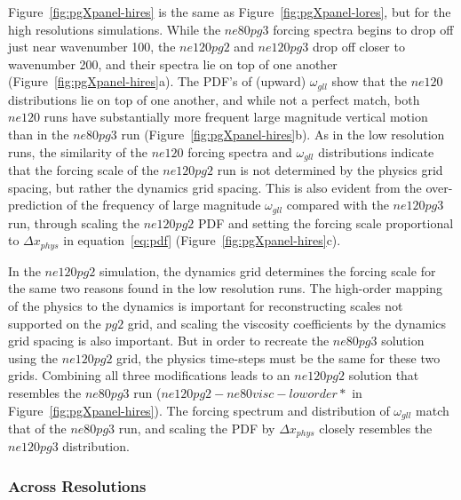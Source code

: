 \documentclass{agujournal}
\begin{document}
Figure~\ref{fig:pgXpanel-hires} is the same as Figure~\ref{fig:pgXpanel-lores}, but for the high resolutions simulations. While the $ne80pg3$ forcing spectra begins to drop off just near wavenumber 100, the $ne120pg2$ and $ne120pg3$ drop off closer to wavenumber 200, and their spectra lie on top of one another (Figure~\ref{fig:pgXpanel-hires}a). The PDF's of (upward) $\omega_{gll}$ show that the $ne120$ distributions lie on top of one another, and while not a perfect match, both $ne120$ runs have substantially more frequent large magnitude vertical motion than in the $ne80pg3$ run (Figure~\ref{fig:pgXpanel-hires}b). As in the low resolution runs, the similarity of the $ne120$ forcing spectra and $\omega_{gll}$ distributions indicate that the forcing scale of the $ne120pg2$ run is not determined by the physics grid spacing, but rather the dynamics grid spacing. This is also evident from the over-prediction of the frequency of large magnitude $\omega_{gll}$ compared with the $ne120pg3$ run, through scaling the $ne120pg2$ PDF and setting the forcing scale proportional to $\Delta x_{phys}$ in equation~\ref{eq:pdf} (Figure~\ref{fig:pgXpanel-hires}c).

In the $ne120pg2$ simulation, the dynamics grid determines the forcing scale for the same two reasons found in the low resolution runs. The high-order mapping of the physics to the dynamics is important for reconstructing scales not supported on the $pg2$ grid, and scaling the viscosity coefficients by the dynamics grid spacing is also important. But in order to recreate the $ne80pg3$ solution using the $ne120pg2$ grid, the physics time-steps must be the same for these two grids. Combining all three modifications leads to an $ne120pg2$ solution that resembles the $ne80pg3$ run ($ne120pg2-ne80visc-loworder*$ in Figure~\ref{fig:pgXpanel-hires}). The forcing spectrum and distribution of $\omega_{gll}$ match that of the $ne80pg3$ run, and scaling the PDF by $\Delta x_{phys}$ closely resembles the $ne120pg3$ distribution.

\subsubsection{Across Resolutions}\label{sec:allres}
\end{document}
